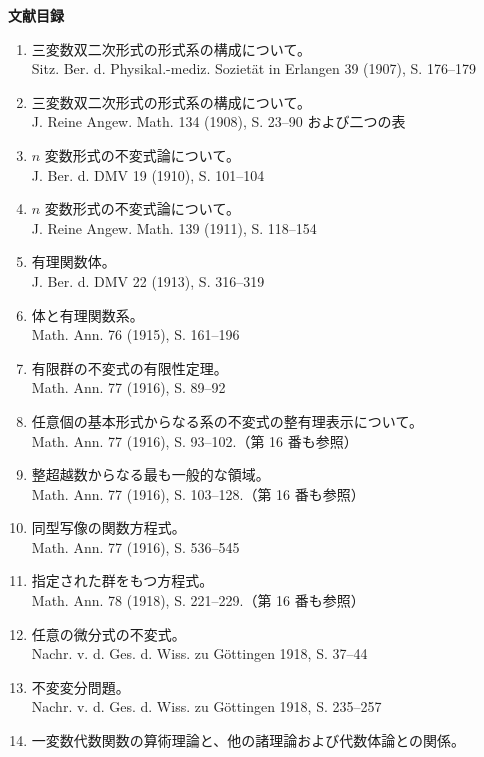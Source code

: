 \clearpage
\clearpage
\begin{center}
{\Large\bfseries 文献目録}
\end{center}
\label{bibliographie}

\begin{enumerate}
\setlength{\itemsep}{0.35em}
\item 三変数双二次形式の形式系の構成について。\\
Sitz. Ber. d. Physikal.-mediz. Sozietät in Erlangen 39 (1907), S. 176--179
\item 三変数双二次形式の形式系の構成について。\\
J. Reine Angew. Math. 134 (1908), S. 23--90 および二つの表
\item \(n\) 変数形式の不変式論について。\\
J. Ber. d. DMV 19 (1910), S. 101--104
\item \(n\) 変数形式の不変式論について。\\
J. Reine Angew. Math. 139 (1911), S. 118--154
\item 有理関数体。\\
J. Ber. d. DMV 22 (1913), S. 316--319
\item 体と有理関数系。\\
Math. Ann. 76 (1915), S. 161--196
\item 有限群の不変式の有限性定理。\\
Math. Ann. 77 (1916), S. 89--92
\item 任意個の基本形式からなる系の不変式の整有理表示について。\\
Math. Ann. 77 (1916), S. 93--102.（第 16 番も参照）
\item 整超越数からなる最も一般的な領域。\\
Math. Ann. 77 (1916), S. 103--128.（第 16 番も参照）
\item 同型写像の関数方程式。\\
Math. Ann. 77 (1916), S. 536--545
\item 指定された群をもつ方程式。\\
Math. Ann. 78 (1918), S. 221--229.（第 16 番も参照）
\item 任意の微分式の不変式。\\
Nachr. v. d. Ges. d. Wiss. zu Göttingen 1918, S. 37--44
\item 不変変分問題。\\
Nachr. v. d. Ges. d. Wiss. zu Göttingen 1918, S. 235--257
\item 一変数代数関数の算術理論と、他の諸理論および代数体論との関係。\\

\end{enumerate}
